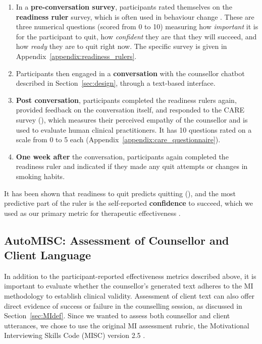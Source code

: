 \begin{enumerate}
[itemsep=1pt, parsep=0pt]
    \item In a \textbf{pre-conversation survey}, participants rated themselves on the \textbf{readiness ruler} survey, which is often used in behaviour change \cite{rollnick1992development}. These are three numerical questions (scored from 0 to 10) measuring how \textit{important} it is for the participant to quit, how \textit{confident} they are that they will succeed, and how \textit{ready} they are to quit right now. The specific survey is given in Appendix~\ref{appendix:readiness_rulers}.

    \item Participants then engaged in a \textbf{conversation} with the counsellor chatbot described in Section~\ref{sec:design}, through a text-based interface.

    \item \textbf{Post conversation}, participants completed the readiness rulers again, provided feedback on the conversation itself, and responded to the CARE survey (\citealp{10.1093/fampra/cmh621, Bikker2015}), which measures their perceived empathy of the counsellor and is used to evaluate human clinical practitioners. It has 10 questions rated on a scale from 0 to 5 each (Appendix~\ref{appendix:care_questionnaire}).

    \item \textbf{One week after} the conversation, participants again completed the readiness ruler and indicated if they made any quit attempts or changes in smoking habits.
\end{enumerate}

It has been shown that readiness to quit predicts quitting (\citealp{Boudreaux2012,10.1093/alcalc/agw047}), and the most predictive part of the ruler is the self-reported \textbf{confidence} to succeed, which we used as our primary metric for therapeutic effectiveness \citep{Gwaltney2009-wj,Abar2013}.


\subsection{AutoMISC: Assessment of Counsellor and Client Language}
\label{sec:automisc}
\label{sec:automisc_val}

In addition to the participant-reported effectiveness metrics described above, it is important to evaluate whether the counsellor's generated text adheres to the MI methodology to establish clinical validity. Assessment of client text can also offer direct evidence of success or failure in the counselling session, as discussed in Section~\ref{sec:MIdef}. Since we wanted to assess both counsellor and client utterances, we chose to use the original MI assessment rubric, the Motivational Interviewing Skills Code (MISC) version 2.5 \cite{MISC}.

